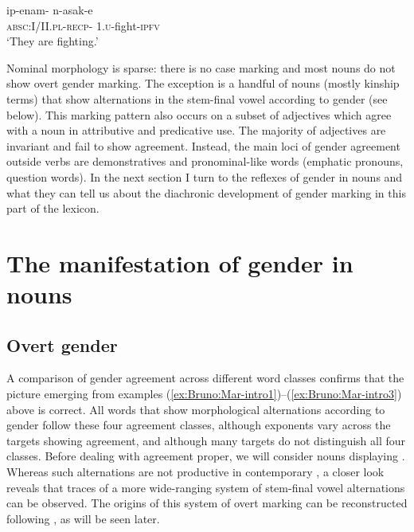 \documentclass[output=collectionpaper]{langsci/langscibook}
\begin{document}
\ea\label{ex:Bruno:fight}
\gll ip-enam- n-asak-e\\
\textsc{absc}:I/II.\textsc{pl}-\textsc{recp}- 1.\textsc{u}-fight-\textsc{ipfv}\\
\glt `They are fighting.'
\z

Nominal morphology is sparse: there is no case marking and most nouns do not show overt gender marking. The exception is a handful of nouns (mostly kinship terms) that show alternations in the stem-final vowel according to gender (see below). This marking pattern also occurs on a subset of adjectives which agree with a noun in attributive and predicative use. The majority of adjectives are invariant and fail to show agreement. Instead, the main loci of gender agreement outside verbs are demonstratives and pronominal-like words (emphatic pronouns, question words). In the next section I turn to the reflexes of gender in nouns and what they can tell us about the diachronic development of gender marking in this part of the lexicon.

\section{The manifestation of gender in nouns}
\label{sec:Bruno:4genders}
\subsection{Overt gender}
\label{sec:Bruno:2.1}
A comparison of gender agreement across different word classes confirms that the picture emerging from examples (\ref{ex:Bruno:Mar-intro1})--(\ref{ex:Bruno:Mar-intro3}) above is correct. All words that show morphological alternations according to gender follow these four agreement clas\-ses, although exponents vary across the targets showing agreement, and although many targets do not distinguish all four classes. Before dealing with agreement proper, we will consider nouns displaying . Whereas such alternations are not productive in contemporary , a closer look reveals that traces of a more wide-ranging system of stem-final vowel alternations can be observed. The origins of this system of overt marking can be reconstructed following \cite{Usher2015}, as will be seen later.
\end{document}
